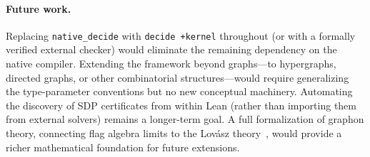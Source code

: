 \documentclass{article}
\newcommand{\lean}[1]{\texttt{#1}}
\begin{document}
\paragraph{Future work.}
Replacing \lean{native\_decide} with \lean{decide +kernel} throughout (or
with a formally verified external checker) would eliminate the remaining
dependency on the native compiler.  Extending the framework beyond graphs---to
hypergraphs, directed graphs, or other combinatorial structures---would require
generalizing the type-parameter conventions but no new conceptual machinery.
Automating the discovery of SDP certificates from within Lean (rather than
importing them from external solvers) remains a longer-term goal.  A full
formalization of graphon theory, connecting flag algebra limits to the
Lov\'asz theory~\cite{lovasz2012large}, would provide a richer mathematical
foundation for future extensions.
\end{document}
